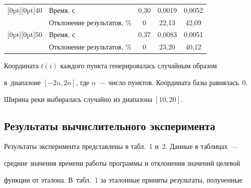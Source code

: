 \begin{table}[b]
\begin{center}
\begin{tabular}{|c|l|c|c|c|}
\hline


\multicolumn{1}{|c|}{\raisebox{-6pt}[0pt][0pt]{40}}&Время, с&0,30&0,0019&0,0052\\


&Отклонение результатов, \%&0&22,13&42,09\\


\hline


\multicolumn{1}{|c|}{\raisebox{-6pt}[0pt][0pt]{50}}&Время, с&0,37&0,0083&0,0051\\


&Отклонение результатов, \%&0&23,20&40,12\\


\hline


\end{tabular}


\end{center}


\vspace*{-6pt}


\end{table}


  


  Координата $t(i)$ каждого пункта генерировалась случайным образом 


в~диапазоне $[-2n, 2n]$, где $n$~--- число пунктов. Координата базы равнялась~0. 


Ширина реки выбиралась случайно из диапазона $[10, 20]$. 





\vspace*{-4pt}


  


\subsection{Результаты вычислительного эксперимента}





\vspace*{-2pt}





  Результаты эксперимента представлены в табл.~1 и~2. Данные в таблицах~--- 


средние значения времени работы программы и отклонения значений целевой 


функции от эталона. В~табл.~1 за эталонные приняты результаты, полученные 


